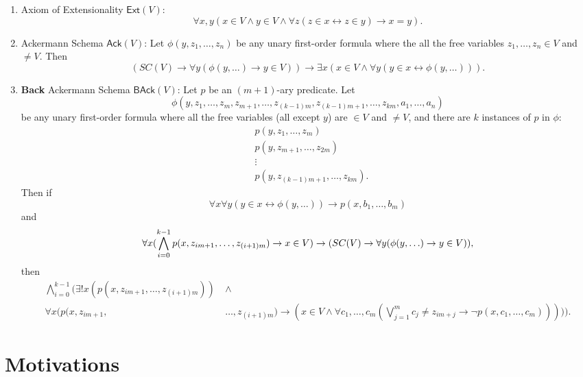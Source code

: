 \documentclass{article}
\begin{document}
\begin{enumerate}
	\item Axiom of Extensionality $\textsf{Ext}(V)$: $$\forall x, y (x \in V \wedge y \in V \wedge \forall z(z\in x \leftrightarrow z \in y) \rightarrow x = y).$$
	\item Ackermann Schema $\textsf{Ack}(V)$: Let $\phi(y, z_1, \ldots, z_n)$ be any unary first-order formula where the all the free variables $z_1, \ldots, z_n \in V$ and $\ne V$. Then $$(SC(V) \rightarrow \forall y(\phi(y, \ldots) \rightarrow y \in V)) \rightarrow \exists x(x \in V \wedge \forall y(y \in x \leftrightarrow \phi(y, \ldots))).$$
    \item \textbf{Back} Ackermann Schema $\textsf{BAck}(V)$: Let $p$ be an $(m+1)$-ary predicate. Let $$\phi(y, z_1, \ldots, z_m, z_{m+1}, \ldots, z_{(k-1)m}, z_{(k-1)m+1}, \ldots, z_{km}, a_1, \ldots, a_n)$$ be any unary first-order formula where all the free variables (all except $y$) are $\in V$ and $\ne V$, and there are $k$ instances of $p$ in $\phi$:
\begin{align*}
&p(y, z_1, \ldots, z_m) \\ &p(y, z_{m+1}, \ldots, z_{2m}) \\ &\vdots \\ &p(y, z_{(k-1)m+1}, \ldots, z_{km}).
\end{align*}
Then if
$$\forall x \forall y (y \in x \leftrightarrow \phi(y, \ldots)) \rightarrow p(x, b_1, \ldots, b_m)$$
and
$$\forall x(\bigwedge_{i=0}^{k-1}{p(x, z_{im+1}, \ldots, z_{(i+1)m})}\rightarrow x \in V) \rightarrow \\ (SC(V) \rightarrow \forall y(\phi(y, \ldots) \rightarrow y \in V)),$$
then
\begin{align*}
\bigwedge_{i=0}^{k-1}\Big(\exists!x(p(x, z_{im+1}, \ldots, z_{(i+1)m}))\ & \wedge \\ \forall x(p(x, z_{im+1}, &\ldots, z_{(i+1)m}) \rightarrow (x \in V \wedge \forall c_1, \ldots, c_m (\bigvee_{j=1}^m {c_j \ne z_{im+j}} \rightarrow \neg p(x, c_1, \ldots, c_m)) )) \Big).
\end{align*}
\end{enumerate}

\section{Motivations}
\end{document}
